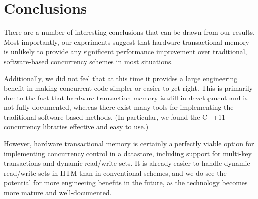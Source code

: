 \section{Conclusions} \label{sec:conclusion}

There are a number of interesting conclusions that can be drawn from our
results. Most importantly, our experiments suggest that hardware transactional
memory is unlikely to provide any significent performance improvement over
traditional, software-based concurrency schemes in most situations.

Additionally, we did not feel that at this time it provides a large engineering
benefit in making concurrent code simpler or easier to get right. This is
primarily due to the fact that hardware transaction memory is still in
development and is not fully documented, whereas there exist many tools for
implementing the traditional software based methods. (In particular, we found
the C++11 concurrency libraries effective and easy to use.)

However, hardware transactional memory is certainly a perfectly viable option
for implementing concurrency control in a datastore, including support for
multi-key transactions and dynamic read/write sets. It is already easier to
handle dynamic read/write sets in HTM than in conventional schemes, and we do
see the potential for more engineering benefits in the future, as the technology
becomes more mature and well-documented.
